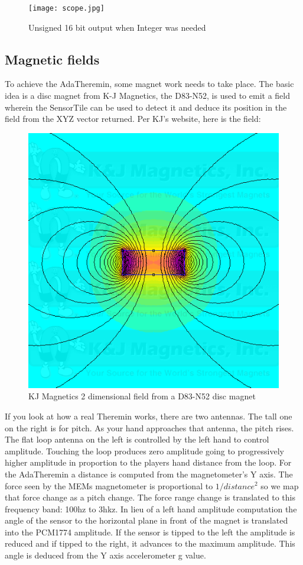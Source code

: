 \documentclass[11pt]{article}
\numberwithin{figure}{section}
\begin{document}
\begin{figure}[H] %
\centering
\texttt{[image: scope.jpg]}
\caption{Unsigned 16 bit output when Integer was needed}
\label{Figure:Scope}
\end{figure}

\subsection{Magnetic fields}
To achieve the AdaTheremin, some magnet work needs to take place. The
basic idea is a disc magnet from K-J Magnetics, the D83-N52, is used
to emit a field wherein the SensorTile can be used to detect it and
deduce its position in the field from the XYZ vector returned. Per
KJ's website, here is the field:

\begin{figure}[H] %
\centering
\includegraphics[scale=0.5]{D83-N52.png}
\caption{KJ Magnetics 2 dimensional field from a D83-N52 disc magnet}
\label{Figure:D83-N52}
\end{figure}

If you look at how a real Theremin works, there are two antennas. The
tall one on the right is for pitch. As your hand approaches that
antenna, the pitch rises. The flat loop antenna on the left is
controlled by the left hand to control amplitude. Touching the loop
produces zero amplitude going to progressively higher amplitude in
proportion to the players hand distance from the loop. For the
AdaTheremin a distance is computed from the magnetometer's Y
axis. The force seen by the MEMs magnetometer is proportional to $1
/ distance^2$ so we map that force change as a pitch change.  The
force range change is translated to this frequency band: 100hz to
3hkz. In lieu of a left hand amplitude computation the angle of the
sensor to the horizontal plane in front of the magnet is translated
into the PCM1774 amplitude. If the sensor is tipped to the left the
amplitude is reduced and if tipped to the right, it advances to the
maximum amplitude. This angle is deduced from the Y axis accelerometer
g value.
\end{document}
